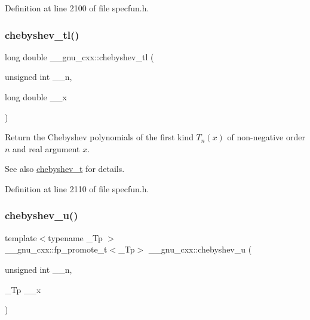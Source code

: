 Definition at line 2100 of file specfun.\+h.

\mbox{\label{group__gnu__math__spec__func_ga0c421700d244cdf58e3ac5ff267664d1}} 
\subsubsection{\texorpdfstring{chebyshev\+\_\+tl()}{chebyshev\_tl()}}
{\footnotesize\ttfamily long double \+\_\+\+\_\+gnu\+\_\+cxx\+::chebyshev\+\_\+tl (\begin{DoxyParamCaption}\item[{unsigned int}]{\+\_\+\+\_\+n,  }\item[{long double}]{\+\_\+\+\_\+x }\end{DoxyParamCaption})\hspace{0.3cm}{\ttfamily [inline]}}

Return the Chebyshev polynomials of the first kind $ T_n(x) $ of non-\/negative order $ n $ and real argument $ x $.

\begin{DoxySeeAlso}{See also}
\hyperlink{group__gnu__math__spec__func_ga4d9cae9de13a64ceeb4fb0226f4b7844}{chebyshev\+\_\+t} for details. 
\end{DoxySeeAlso}


Definition at line 2110 of file specfun.\+h.

\mbox{\label{group__gnu__math__spec__func_gafa90c06bdedb8459f20576297cf1608f}} 
\subsubsection{\texorpdfstring{chebyshev\+\_\+u()}{chebyshev\_u()}}
{\footnotesize\ttfamily template$<$typename \+\_\+\+Tp $>$ \\
\+\_\+\+\_\+gnu\+\_\+cxx\+::fp\+\_\+promote\+\_\+t$<$\+\_\+\+Tp$>$ \+\_\+\+\_\+gnu\+\_\+cxx\+::chebyshev\+\_\+u (\begin{DoxyParamCaption}\item[{unsigned int}]{\+\_\+\+\_\+n,  }\item[{\+\_\+\+Tp}]{\+\_\+\+\_\+x }\end{DoxyParamCaption})\hspace{0.3cm}{\ttfamily [inline]}}

